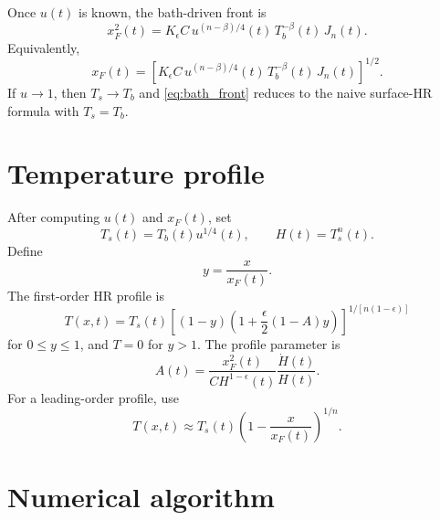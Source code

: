 \documentclass[11pt]{article}
\newcommand{\Tb}{T_b}
\newcommand{\Ts}{T_s}
\newcommand{\xf}{x_F}
\newcommand{\eps}{\epsilon}
\newcommand{\Jn}{J_n}
\begin{document}
Once $u(t)$ is known, the bath-driven front is
\begin{equation}
 \boxed{
 \xf^2(t)=K_\eps C\,
 u^{(n-\beta)/4}(t)\,\Tb^{-\beta}(t)\,\Jn(t).}
 \label{eq:bath_front}
\end{equation}
Equivalently,
\begin{equation}
 \boxed{
 \xf(t)=\left[K_\eps C\,
 u^{(n-\beta)/4}(t)\,\Tb^{-\beta}(t)\,\Jn(t)\right]^{1/2}.}
 \label{eq:bath_front_sqrt}
\end{equation}
If $u\to 1$, then $\Ts\to\Tb$ and \eqref{eq:bath_front} reduces to the naive
surface-HR formula with $\Ts=\Tb$.

\section{Temperature profile}

After computing $u(t)$ and $\xf(t)$, set
\begin{equation}
 \boxed{\Ts(t)=\Tb(t)u^{1/4}(t),\qquad H(t)=\Ts^n(t).}
\end{equation}
Define
\begin{equation}
 y=\frac{x}{\xf(t)}.
\end{equation}
The first-order HR profile is
\begin{equation}
 \boxed{
 T(x,t)=\Ts(t)
 \left[(1-y)\left(1+\frac{\eps}{2}(1-A)y\right)\right]^{1/[n(1-\eps)]}}
 \label{eq:profile}
\end{equation}
for $0\le y\le 1$, and $T=0$ for $y>1$.  The profile parameter is
\begin{equation}
 \boxed{
 A(t)=\frac{\xf^2(t)}{C H^{1-\eps}(t)}\frac{\dot H(t)}{H(t)}.}
 \label{eq:A}
\end{equation}
For a leading-order profile, use
\begin{equation}
 \boxed{
 T(x,t)\approx \Ts(t)\left(1-\frac{x}{\xf(t)}\right)^{1/n}.}
 \label{eq:leading_profile}
\end{equation}

\section{Numerical algorithm}
\end{document}
